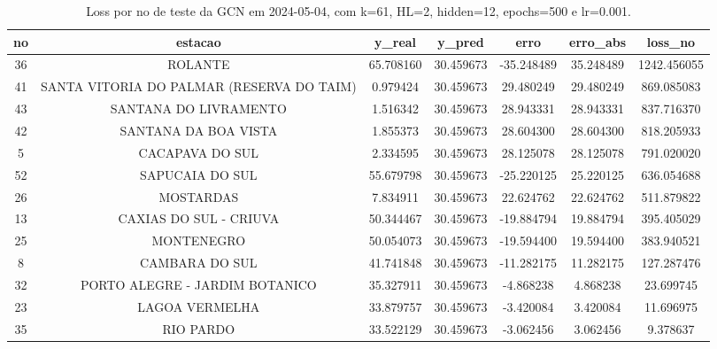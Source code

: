 \begin{table}[h]
\centering
\caption{Loss por no de teste da GCN em 2024-05-04, com k=61, HL=2, hidden=12, epochs=500 e lr=0.001.}
\label{tab:gcn_loss_k61_hl2_h12_e500_d20240504}
\begin{tabular}{ccccccc}
\toprule
no & estacao & y\_real & y\_pred & erro & erro\_abs & loss\_no \\
\midrule
36 & ROLANTE & 65.708160 & 30.459673 & -35.248489 & 35.248489 & 1242.456055 \\
41 & SANTA VITORIA DO PALMAR (RESERVA DO TAIM) & 0.979424 & 30.459673 & 29.480249 & 29.480249 & 869.085083 \\
43 & SANTANA DO LIVRAMENTO & 1.516342 & 30.459673 & 28.943331 & 28.943331 & 837.716370 \\
42 & SANTANA DA BOA VISTA & 1.855373 & 30.459673 & 28.604300 & 28.604300 & 818.205933 \\
5 & CACAPAVA DO SUL & 2.334595 & 30.459673 & 28.125078 & 28.125078 & 791.020020 \\
52 & SAPUCAIA DO SUL & 55.679798 & 30.459673 & -25.220125 & 25.220125 & 636.054688 \\
26 & MOSTARDAS & 7.834911 & 30.459673 & 22.624762 & 22.624762 & 511.879822 \\
13 & CAXIAS DO SUL - CRIUVA & 50.344467 & 30.459673 & -19.884794 & 19.884794 & 395.405029 \\
25 & MONTENEGRO & 50.054073 & 30.459673 & -19.594400 & 19.594400 & 383.940521 \\
8 & CAMBARA DO SUL & 41.741848 & 30.459673 & -11.282175 & 11.282175 & 127.287476 \\
32 & PORTO ALEGRE - JARDIM BOTANICO & 35.327911 & 30.459673 & -4.868238 & 4.868238 & 23.699745 \\
23 & LAGOA VERMELHA & 33.879757 & 30.459673 & -3.420084 & 3.420084 & 11.696975 \\
35 & RIO PARDO & 33.522129 & 30.459673 & -3.062456 & 3.062456 & 9.378637 \\
\bottomrule
\end{tabular}
\end{table}
